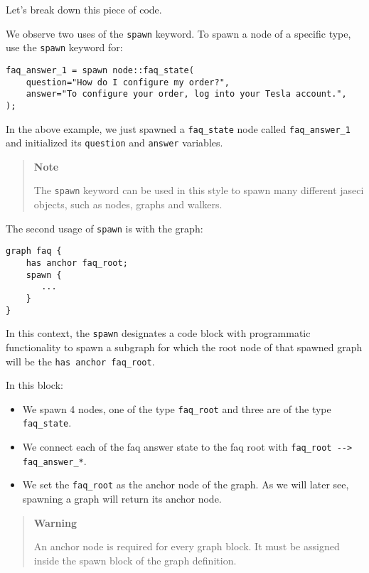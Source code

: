 Let's break down this piece of code.

We observe two uses of the \lstinline!spawn! keyword. To spawn a node of
a specific type, use the \lstinline!spawn! keyword for:

\begin{lstlisting}
faq_answer_1 = spawn node::faq_state(
    question="How do I configure my order?",
    answer="To configure your order, log into your Tesla account.",
);
\end{lstlisting}

In the above example, we just spawned a \lstinline!faq_state! node
called \lstinline!faq_answer_1! and initialized its \lstinline!question!
and \lstinline!answer! variables.

\begin{quote}
\textbf{Note}

The \lstinline!spawn! keyword can be used in this style to spawn many
different jaseci objects, such as nodes, graphs and walkers.
\end{quote}

The second usage of \lstinline!spawn! is with the graph:

\begin{lstlisting}
graph faq {
    has anchor faq_root;
    spawn {
       ...
    }
}
\end{lstlisting}

In this context, the \lstinline!spawn! designates a code block with
programmatic functionality to spawn a subgraph for which the root node
of that spawned graph will be the \lstinline!has anchor faq_root!.

In this block:

\begin{itemize}
\tightlist
\item
  We spawn 4 nodes, one of the type \lstinline!faq_root! and three are
  of the type \lstinline!faq_state!.
\item
  We connect each of the faq answer state to the faq root with
  \lstinline!faq_root --> faq_answer_*!.
\item
  We set the \lstinline!faq_root! as the anchor node of the graph. As we
  will later see, spawning a graph will return its anchor node.
\end{itemize}

\begin{quote}
\textbf{Warning}

An anchor node is required for every graph block. It must be assigned
inside the spawn block of the graph definition.
\end{quote}

